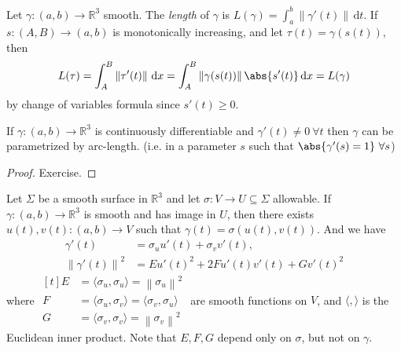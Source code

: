 Let \(\gamma: (a,b) \to \mathbb{R}^3\) smooth. The \textit{length} of \(\gamma\) is \(L(\gamma) = \int_a^b \left\lVert \gamma'(t)\right\rVert\,\mathrm{d}t\). If \(s: (A,B) \to (a,b)\) is monotonically increasing, and let \(\tau(t) = \gamma(s(t))\), then
\[
    L(\tau)=\int_{A}^{B} \left\lVert \tau'(t)\right\rVert \,\mathrm{d}x=\int_{A}^{B}\left\lVert \gamma(s(t))\right\rVert \abs{s'(t)} \,\mathrm{d}x = L(\gamma)
\]
by change of variables formula since \(s'(t) \geq 0\).
\begin{lemma}{}{}
    If \(\gamma:(a,b)\to \mathbb{R}^3\) is continuously differentiable and \(\gamma'(t)\neq 0~\forall t\) then \(\gamma\) can be parametrized by arc-length. (i.e. in a parameter \(s\) such that \(\abs{\gamma'(s)=1}~\forall s\))
\end{lemma}
\begin{proof}
    Exercise.
\end{proof}
Let \(\Sigma\) be a smooth surface in \(\mathbb{R}^3\) and let \(\sigma: V \to U \subseteq \Sigma\) allowable. If \(\gamma: (a,b) \to \mathbb{R}^3\) is smooth and has image in \(U\), then there exists \(u(t), v(t): (a,b) \to V\) such that \(\gamma(t) = \sigma(u(t), v(t))\). And we have
\begin{align*}
    \gamma'(t) &= \sigma_u u'(t)+ \sigma_v v'(t),\\
    \left\lVert \gamma'(t)\right\rVert^2 &= E u'(t)^2 + 2 F u'(t)v'(t) + G v'(t)^2
\end{align*}
where \(\begin{aligned}[t]
    E &= \langle \sigma_u, \sigma_u\rangle = \left\lVert \sigma_u\right\rVert^2\\
    F &= \langle \sigma_u, \sigma_v\rangle = \langle \sigma_v, \sigma_u \rangle\\
    G &= \langle \sigma_v, \sigma_v\rangle = \left\lVert \sigma_v\right\rVert^2
\end{aligned}\) are smooth functions on \(V\), and \(\langle , \rangle\) is the Euclidean inner product. Note that \(E,F,G\) depend only on \(\sigma\), but not on \(\gamma\).

